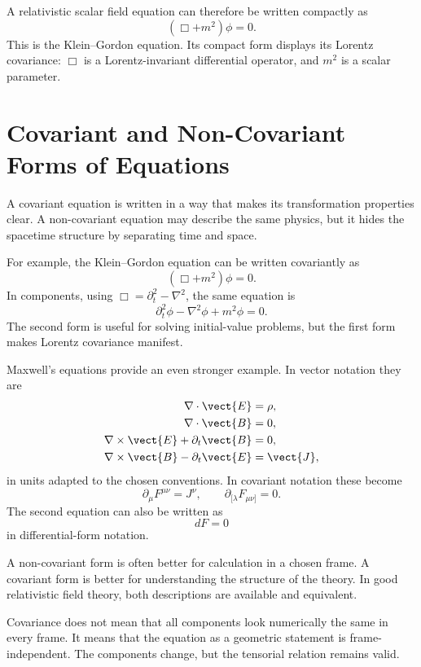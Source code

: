 A relativistic scalar field equation can therefore be written compactly as
\[
    (\Box+m^2)\phi=0.
\]
This is the Klein--Gordon equation. Its compact form displays its Lorentz
covariance: \(\Box\) is a Lorentz-invariant differential operator, and \(m^2\) is
a scalar parameter.

\section{Covariant and Non-Covariant Forms of Equations}

A covariant equation is written in a way that makes its transformation
properties clear. A non-covariant equation may describe the same physics, but it
hides the spacetime structure by separating time and space.

For example, the Klein--Gordon equation can be written covariantly as
\[
    (\Box+m^2)\phi=0.
\]
In components, using \(\Box=\partial_t^2-\nabla^2\), the same equation is
\[
    \partial_t^2\phi-\nabla^2\phi+m^2\phi=0.
\]
The second form is useful for solving initial-value problems, but the first form
makes Lorentz covariance manifest.

Maxwell's equations provide an even stronger example. In vector notation they
are
\[
\begin{aligned}
    \nabla\cdot\vect{E} &= \rho,\\
    \nabla\cdot\vect{B} &= 0,\\
    \nabla\times\vect{E} + \partial_t\vect{B} &= 0,\\
    \nabla\times\vect{B} - \partial_t\vect{E} &= \vect{J},
\end{aligned}
\]
in units adapted to the chosen conventions. In covariant notation these become
\[
    \partial_\mu F^{\mu\nu}=J^\nu,
    \qquad
    \partial_{[\lambda}F_{\mu\nu]}=0.
\]
The second equation can also be written as
\[
    dF=0
\]
in differential-form notation.

\begin{examplebox}
A non-covariant form is often better for calculation in a chosen frame. A
covariant form is better for understanding the structure of the theory. In good
relativistic field theory, both descriptions are available and equivalent.
\end{examplebox}

Covariance does not mean that all components look numerically the same in every
frame. It means that the equation as a geometric statement is frame-independent.
The components change, but the tensorial relation remains valid.

